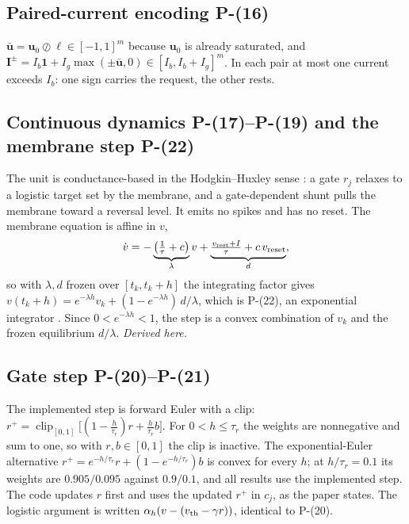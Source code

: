 \documentclass[11pt]{article}
\newcommand{\srcroot}{../..}
\newcommand{\clip}{\operatorname{clip}}
\newcommand{\Peq}[1]{P-(#1)}
\newcommand{\code}[1]{\path{#1}}
\theoremstyle{remark}
\newcommand{\listing}[4]{%
  \Needspace{8\baselineskip}%
  }
\begin{document}
\subsection{Paired-current encoding \Peq{16}}
$\bar{\bm u}=\bm u_0\oslash\bm\ell\in[-1,1]^m$ because $\bm u_0$ is already saturated, and
$\bm I^\pm=I_b\bm1+I_g\max(\pm\bar{\bm u},0)\in[I_b,I_b+I_g]^m$. In each pair at most one current exceeds $I_b$: one sign carries
the request, the other rests.
\listing{experiments/nengo_nef_replication_2026-08-29/nengo_cmg.py}{318}{334}{normalized request, paired currents, clipped PES target}

\subsection{Continuous dynamics \Peq{17}--\Peq{19} and the membrane step \Peq{22}}
The unit is conductance-based in the Hodgkin--Huxley sense \cite{hodgkin1952quantitative}: a gate $r_j$ relaxes to a
logistic target set by the membrane, and a gate-dependent shunt pulls the membrane toward a reversal level. It emits no
spikes and has no reset. The membrane equation is affine in $v$,
\[
\dot v=-\underbrace{\big(\tfrac1\tau+c\big)}_{\lambda}v+\underbrace{\tfrac{v_{\rm rest}+I}{\tau}+c\,v_{\rm reset}}_{d},
\]
so with $\lambda,d$ frozen over $[t_k,t_k+h]$ the integrating factor gives
$v(t_k+h)=e^{-\lambda h}v_k+(1-e^{-\lambda h})\,d/\lambda$, which is \Peq{22}, an exponential integrator
\cite{hochbruck2010exponential}. Since $0<e^{-\lambda h}<1$, the step is a convex combination of $v_k$ and the frozen
equilibrium $d/\lambda$. \emph{Derived here.}

\subsection{Gate step \Peq{20}--\Peq{21}}
The implemented step is forward Euler with a clip: $r^+=\clip_{[0,1]}\big[(1-\tfrac h{\tau_r})r+\tfrac h{\tau_r}b\big]$. For
$0<h\le\tau_r$ the weights are nonnegative and sum to one, so with $r,b\in[0,1]$ the clip is inactive. The exponential-Euler
alternative $r^+=e^{-h/\tau_r}r+(1-e^{-h/\tau_r})b$ is convex for every $h$; at $h/\tau_r=0.1$ its weights are $0.905/0.095$
against $0.9/0.1$, and all results use the implemented step. The code updates $r$ first and uses the updated $r^+$ in
$c_j$, as the paper states. The logistic argument is written $\alpha_h(v-(v_{\rm th}-\gamma r))$, identical to \Peq{20}.
\listing{experiments/nengo_nef_replication_2026-08-29/nengo_cmg.py}{71}{89}{Nengo \code{NeuronType.step}: gate (Euler + clip), membrane \Peq{22}, activity $\clip(Gr)$}
\listing{src/gra_control/gate.py}{41}{55}{the direct NumPy bank: the same update, line for line}
\end{document}
